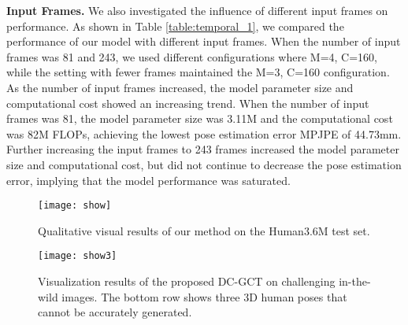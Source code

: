 \documentclass[journal]{IEEEtran}
\begin{document}
\begin{table}[htbp]
  \renewcommand{\arraystretch}{1.2}
\caption{Ablation study on the different input frames on the Human3.6m dataset.}
\label{table:temporal_1}
\centering {}
\end{table}







{\bf{Input Frames.}} We also investigated the influence of different input frames on performance. As shown in Table \ref{table:temporal_1}, we compared the performance of our model with different input frames. When the number of input frames was 81 and 243, we used different configurations where M=4, C=160, while the setting with fewer frames maintained the M=3, C=160 configuration. As the number of input frames increased, the model parameter size and computational cost showed an increasing trend. When the number of input frames was 81, the model parameter size was 3.11M and the computational cost was 82M FLOPs, achieving the lowest pose estimation error MPJPE of 44.73mm. Further increasing the input frames to 243 frames increased the model parameter size and computational cost, but did not continue to decrease the pose estimation error, implying that the model performance was saturated. 





\begin{figure}[ht]
  \centering
  \texttt{[image: show]}
  \caption{Qualitative visual results of our method on the Human3.6M test set. }
  \label{fig:show1}
\end{figure}


\begin{figure}[ht]
  \centering
  \texttt{[image: show3]}
  \caption{Visualization results of the proposed DC-GCT on challenging in-the-wild images. The bottom row shows three 3D human poses that cannot be accurately generated.}
  \label{fig:show3}
\end{figure}
\end{document}
